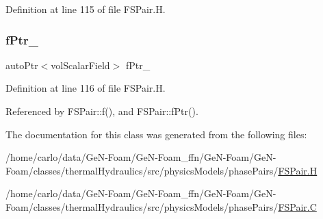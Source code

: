 Definition at line 115 of file F\+S\+Pair.\+H.

\mbox{\label{classFoam_1_1FSPair_a4201dfbab31ceb1e35ce7101411dcbd0}} 
\subsubsection{\texorpdfstring{f\+Ptr\+\_\+}{fPtr\_}}
{\footnotesize\ttfamily auto\+Ptr$<$vol\+Scalar\+Field$>$ f\+Ptr\+\_\+\hspace{0.3cm}{\ttfamily [protected]}}



Definition at line 116 of file F\+S\+Pair.\+H.



Referenced by F\+S\+Pair\+::f(), and F\+S\+Pair\+::f\+Ptr().



The documentation for this class was generated from the following files\+:\begin{DoxyCompactItemize}
\item 
/home/carlo/data/\+Ge\+N-\/\+Foam/\+Ge\+N-\/\+Foam\+\_\+ffn/\+Ge\+N-\/\+Foam/\+Ge\+N-\/\+Foam/classes/thermal\+Hydraulics/src/physics\+Models/phase\+Pairs/\hyperlink{FSPair_8H}{F\+S\+Pair.\+H}\item 
/home/carlo/data/\+Ge\+N-\/\+Foam/\+Ge\+N-\/\+Foam\+\_\+ffn/\+Ge\+N-\/\+Foam/\+Ge\+N-\/\+Foam/classes/thermal\+Hydraulics/src/physics\+Models/phase\+Pairs/\hyperlink{FSPair_8C}{F\+S\+Pair.\+C}\end{DoxyCompactItemize}
